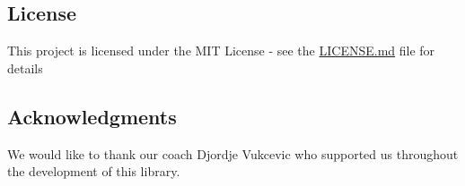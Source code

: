 \subsection*{License}

This project is licensed under the M\+IT License -\/ see the \hyperlink{md_LICENSE}{L\+I\+C\+E\+N\+SE.md} file for details

\subsection*{Acknowledgments}


\begin{DoxyItemize}
\item We would like to thank our coach Djordje Vukcevic who supported us throughout the development of this library. 
\end{DoxyItemize}